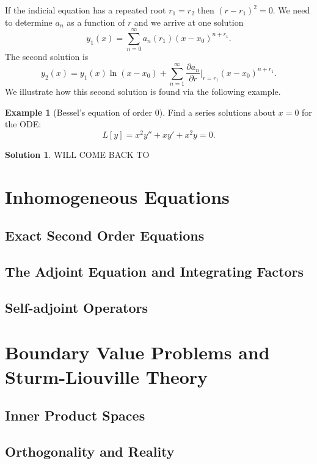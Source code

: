 \documentclass{article}
\theoremstyle{plain}
\theoremstyle{definition}
\newtheorem{exmp}{Example}[section]
\newtheorem*{sol}{Solution}
\numberwithin{equation}{section}
\begin{document}
If the indicial equation has a repeated root $r_1=r_2$ then $(r-r_1)^2=0$. We need to determine $a_n$ as a function of $r$ and we arrive at one solution
\[
y_1(x) = \sum_{n=0}^{\infty} a_n(r_1)(x-x_0)^{n+r_1}.
\]
The second solution is
\[
y_2(x) = y_1(x)\ln (x-x_0) + \sum_{n=1}^{\infty} \frac{\partial a_n}{\partial r}\Big\vert_{r=r_1} (x-x_0)^{n+r_1}.
\]
We illustrate how this second solution is found via the following example.

\begin{tcolorbox}
    \begin{exmp}[Bessel's equation of order 0]
        Find a series solutions about $x=0$ for the ODE:
        \[
        L[y] = x^2y'' + xy' + x^2y = 0.
        \]
    \end{exmp}
    \begin{sol}
        WILL COME BACK TO
    \end{sol}
\end{tcolorbox}

\section{Inhomogeneous Equations}

\subsection{Exact Second Order Equations}

\subsection{The Adjoint Equation and Integrating Factors}

\subsection{Self-adjoint Operators}

\section{Boundary Value Problems and Sturm-Liouville Theory}

\subsection{Inner Product Spaces}

\subsection{Orthogonality and Reality}
\end{document}

